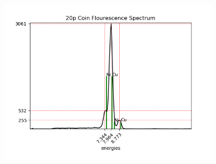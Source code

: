 \documentclass[8pt, a4paper]{article}
\begin{document}
\begin{figure}[h]
\includegraphics{f20p}
\end{figure}
\end{document}
